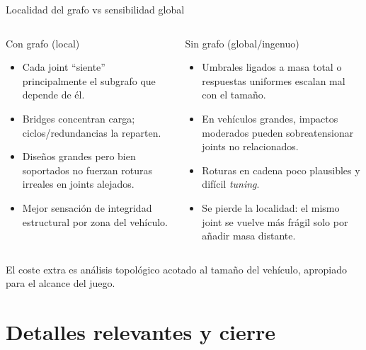 \documentclass[aspectratio=169,11pt]{beamer}
\begin{document}
\begin{frame}{Localidad del grafo vs sensibilidad global}
  \begin{columns}[T]
    \begin{block}{Con grafo (local)}
      \begin{itemize}
        \item Cada joint ``siente'' principalmente el subgrafo que depende de él.
        \item Bridges concentran carga; ciclos/redundancias la reparten.
        \item Diseños grandes pero bien soportados no fuerzan roturas irreales en joints alejados.
        \item Mejor sensación de integridad estructural por zona del vehículo.
      \end{itemize}
    \end{block}
    \begin{block}{Sin grafo (global/ingenuo)}
      \begin{itemize}
        \item Umbrales ligados a masa total o respuestas uniformes escalan mal con el tamaño.
        \item En vehículos grandes, impactos moderados pueden sobreatensionar joints no relacionados.
        \item Roturas en cadena poco plausibles y difícil \emph{tuning}.
        \item Se pierde la localidad: el mismo joint se vuelve más frágil solo por añadir masa distante.
      \end{itemize}
    \end{block}
  \end{columns}

  \vspace{0.1cm}
  \begin{center}
    \small El coste extra es análisis topológico acotado al tamaño del vehículo, apropiado para el alcance del juego.
  \end{center}
\end{frame}

\section{Detalles relevantes y cierre}
\end{document}
